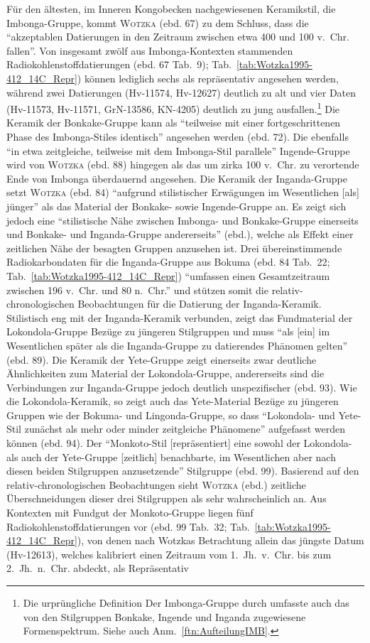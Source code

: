 Für den ältesten, im Inneren Kongobecken nachgewiesenen Keramikstil, die Imbonga-Gruppe, kommt \textsc{Wotzka} (ebd. 67) zu dem Schluss, dass die \enquote{akzeptablen Datierungen in den Zeitraum zwischen etwa 400 und 100 v.~Chr. fallen}. Von insgesamt zwölf aus Imbonga-Kontexten stammenden Radiokohlenstoffdatierungen (ebd. 67 Tab.~9); Tab.~\ref{tab:Wotzka1995-412_14C_Repr}) können lediglich sechs als repräsentativ angesehen werden, während zwei Datierungen (Hv-11574, Hv-12627) deutlich zu alt und vier Daten (Hv-11573, Hv-11571, GrN-13586, KN-4205) deutlich zu jung ausfallen.\footnote{Die urprüngliche Definition Der Imbonga-Gruppe durch \textcite{Eggert.1983} umfasste auch das von \textcite{Wotzka.1995} den Stilgruppen Bonkake, Ingende und Inganda zugewiesene Formenspektrum. Siehe auch Anm.~\ref{ftn:AufteilungIMB}.} Die Keramik der Bonkake-Gruppe kann als \enquote{teilweise mit einer fortgeschrittenen Phase des Imbonga-Stiles identisch} angesehen werden (ebd. 72). Die ebenfalls \enquote{in etwa zeitgleiche, teilweise mit dem Imbonga-Stil parallele} Ingende-Gruppe wird von \textsc{Wotzka} (ebd. 88) hingegen als das um zirka 100 v.~Chr. zu verortende Ende von Imbonga überdauernd angesehen. Die Keramik der Inganda-Gruppe setzt \textsc{Wotzka} (ebd. 84) \enquote{aufgrund stilistischer Erwägungen im Wesentlichen [als] jünger} als das Material der Bonkake- sowie Ingende-Gruppe an. Es zeigt sich jedoch eine \enquote{stilistische Nähe zwischen Imbonga- und Bonkake-Gruppe einerseits und Bonkake- und Inganda-Gruppe andererseits} (ebd.), welche als Effekt einer zeitlichen Nähe der besagten Gruppen anzusehen ist. Drei übereinstimmende Radiokarbondaten für die Inganda-Gruppe aus Bokuma (ebd. 84 Tab.~22; Tab.~\ref{tab:Wotzka1995-412_14C_Repr}) \enquote{umfassen einen Gesamtzeitraum zwischen 196 v.~Chr. und 80 n.~Chr.} und stützen somit die relativ-chronologischen Beobachtungen für die Datierung der Inganda-Keramik. Stilistisch eng mit der Inganda-Keramik verbunden, zeigt das Fundmaterial der Lokondola-Gruppe Bezüge zu jüngeren Stilgruppen und muss \enquote{als [ein] im Wesentlichen später als die Inganda-Gruppe zu datierendes Phänomen gelten} (ebd. 89). Die Keramik der Yete-Gruppe zeigt einerseits zwar deutliche Ähnlichkeiten zum Material der Lokondola-Gruppe, andererseits sind die Verbindungen zur Inganda-Gruppe jedoch deutlich unspezifischer (ebd. 93). Wie die Lokondola-Keramik, so zeigt auch das Yete-Material Bezüge zu jüngeren Gruppen wie der Bokuma- und Lingonda-Gruppe, so dass \enquote{Lokondola- und Yete-Stil zunächst als mehr oder minder zeitgleiche Phänomene} aufgefasst werden können (ebd. 94). Der \enquote{Monkoto-Stil [repräsentiert] eine sowohl der Lokondola- als auch der Yete-Gruppe [zeitlich] benachbarte, im Wesentlichen aber nach diesen beiden Stilgruppen anzusetzende} Stilgruppe (ebd. 99). Basierend auf den relativ-chronologischen Beobachtungen sieht \textsc{Wotzka} (ebd.) zeitliche Überschneidungen dieser drei Stilgruppen als sehr wahrscheinlich an. Aus Kontexten mit Fundgut der Monkoto-Gruppe liegen fünf Radiokohlenstoffdatierungen vor (ebd. 99 Tab.~32; Tab.~\ref{tab:Wotzka1995-412_14C_Repr}), von denen nach Wotzkas Betrachtung allein das jüngste Datum (Hv-12613), welches kalibriert einen Zeitraum vom 1.~Jh.~v.~Chr. bis zum 2.~Jh.~n.~Chr. abdeckt, als Repräsentativ 